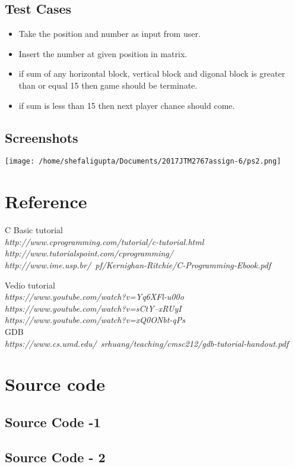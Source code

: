 \documentclass[a4paper,10pt]{report}
\begin{document}
\subsection{Test Cases}

\begin{itemize}
 \item Take the position and number as input from user.
 \item Insert the number at given position in matrix.
 \item if sum of any horizontal block, vertical block and digonal block is greater than or equal 15 then game should be terminate.
 \item if sum is less than 15 then next player chance should come.
 
\end{itemize}



\subsection{Screenshots}
\texttt{[image: /home/shefaligupta/Documents/2017JTM2767assign-6/ps2.png]}


\section{Reference}

\begin{thebibliography}{9}
 C Basic tutorial\\
 \textit{http://www.cprogramming.com/tutorial/c-tutorial.html\\ http://www.tutorialspoint.com/cprogramming/ \\ http://www.ime.usp.br/~pf/Kernighan-Ritchie/C-Programming-Ebook.pdf}
 
 Vedio tutorial\\
 \textit{https://www.youtube.com/watch?v=Yq6XFl-u00o}\\
 \textit{https://www.youtube.com/watch?v=sCtY--xRUyI}\\
 \textit{https://www.youtube.com/watch?v=xQ0ONbt-qPs}\\
 
 GDB \\
 \textit{https://www.cs.umd.edu/~srhuang/teaching/cmsc212/gdb-tutorial-handout.pdf}
\end{thebibliography}

\section{Source code}

\subsection{Source Code -1}



\subsection{Source Code - 2}


\end{document}
